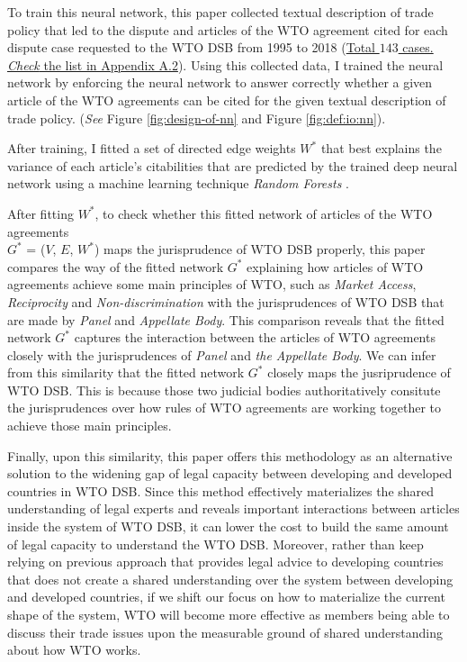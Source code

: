 
To train this neural network, this paper collected textual description of trade policy 
that led to the dispute and articles of the WTO agreement cited for each dispute
case requested to the WTO DSB 
from 1995 to 2018 (\hyperref[sub:cited-articles-table]{Total $143$ cases. \textit{Check} the list in Appendix A.2}).
Using this collected data, I trained the neural network by enforcing the neural network to answer correctly 
whether a given article of the WTO agreements
can be cited for the given textual description of 
trade policy. (\textit{See} Figure \ref{fig:design-of-nn} and Figure \ref{fig:def:io:nn}).

After training, I fitted a set of directed edge weights $W^*$ that 
best explains the variance of each article's citabilities that are predicted by the trained deep neural network using a machine learning technique \textit{Random Forests} \citep{rf, genie3}. 

After fitting $W^*$, to check whether this fitted network of articles of the WTO agreements\\  $G^*$ = ($V$, $E$, $W^*$) maps the jurisprudence of WTO DSB properly, this paper
compares the way of the fitted network $G^*$ explaining how articles of WTO agreements achieve some main principles of WTO, such as \textit{Market Access}, \textit{Reciprocity} and \textit{Non-discrimination} 
with the jurisprudences of WTO DSB that are made by \textit{Panel} and \textit{Appellate Body}. This comparison reveals that the fitted network $G^*$ captures the interaction between the articles of WTO agreements
closely with the jurisprudences of \textit{Panel} and \textit{the Appellate Body}. We can infer from this similarity that the fitted network $G^*$ closely maps the jusriprudence of WTO DSB. This is because those two judicial bodies 
authoritatively consitute the jurisprudences over how rules of WTO agreements are working together 
to achieve those main principles.

Finally, upon this similarity, this paper offers this methodology as
an alternative solution to the widening gap of legal capacity between developing and developed countries in WTO DSB.
Since this method effectively materializes the shared understanding of legal experts and reveals important interactions between articles inside the system of WTO DSB,
it can lower the cost to build the same amount of legal capacity to understand the WTO DSB.
Moreover, rather than keep relying on previous approach that provides legal advice to developing countries that does not create a shared understanding over the system between developing and developed countries,
if we shift our focus on how to materialize the current shape of the system, WTO
will become more effective as members being able to discuss their trade issues upon the measurable ground of shared understanding about how WTO works.


